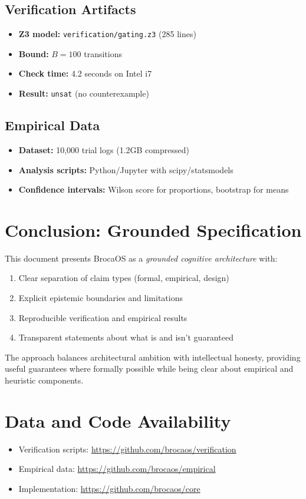 \documentclass[12pt]{article}
\theoremstyle{definition}
\begin{document}
\subsection{Verification Artifacts}

\begin{itemize}
    \item \textbf{Z3 model:} \texttt{verification/gating.z3} (285 lines)
    \item \textbf{Bound:} $B=100$ transitions
    \item \textbf{Check time:} 4.2 seconds on Intel i7
    \item \textbf{Result:} \texttt{unsat} (no counterexample)
\end{itemize}

\subsection{Empirical Data}

\begin{itemize}
    \item \textbf{Dataset:} 10,000 trial logs (1.2GB compressed)
    \item \textbf{Analysis scripts:} Python/Jupyter with scipy/statsmodels
    \item \textbf{Confidence intervals:} Wilson score for proportions, bootstrap for means
\end{itemize}

\section{Conclusion: Grounded Specification}

This document presents BrocaOS as a \emph{grounded cognitive architecture} with:
\begin{enumerate}
    \item Clear separation of claim types (formal, empirical, design)
    \item Explicit epistemic boundaries and limitations
    \item Reproducible verification and empirical results
    \item Transparent statements about what is and isn't guaranteed
\end{enumerate}

The approach balances architectural ambition with intellectual honesty, providing useful guarantees where formally possible while being clear about empirical and heuristic components.

\section*{Data and Code Availability}

\begin{itemize}
    \item Verification scripts: \url{https://github.com/brocaos/verification}
    \item Empirical data: \url{https://github.com/brocaos/empirical}
    \item Implementation: \url{https://github.com/brocaos/core}
\end{itemize}
\end{document}

